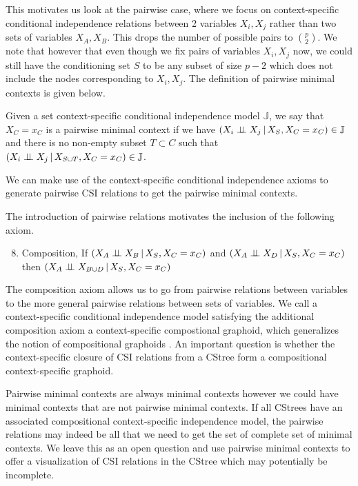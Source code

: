 \documentclass{tufte-book}
\begin{document}
This motivates us look at the pairwise case, where we focus on context-specific conditional independence relations between 2 variables \(X_i,X_j\) rather than two sets of variables \(X_A,X_B\). This drops the number of possible pairs to \(p \choose 2\). We note that however that even though we fix pairs of variables \(X_i,X_j\) now, we could still have the conditioning set \(S\) to be any subset of size \(p-2\) which does not include the nodes corresponding to \(X_i,X_j\). The definition of pairwise minimal contexts is given below.


\begin{definition}\label{def:pairmcs}
Given a set context-specific conditional independence model $\mathbb{J}$, we say that ${X_C=x_C}$ is a pairwise minimal context if we have $(X_i  \perp \!\!\! \perp X_j \,|\, X_S, X_C=x_C) \in \mathbb{J}$ and there is no non-empty subset $T \subset C$ such that $(X_i \perp \!\!\! \perp X_j \,|\, X_{S \cup T}, X_C=x_C) \in \mathbb{J}$.
\end{definition}

We can make use of the context-specific conditional independence axioms to generate pairwise CSI relations to get the pairwise minimal contexts.


The introduction of pairwise relations motivates the inclusion of the following axiom.
\begin{enumerate}
\setcounter{enumi}{7}
\item Composition, If \((X_A \perp \!\!\! \perp X_B \,|\, X_S, X_C=x_C)\) and \((X_A \perp \!\!\! \perp X_D \,|\,X_S,X_C=x_C)\) then \((X_A \perp \!\!\! \perp X_{B\cup D} \,|\,X_S,X_C=x_C)\)
\end{enumerate}


The composition axiom allows us to go from pairwise relations between variables to the more general pairwise relations between sets of variables. We call a context-specific conditional independence model satisfying the additional composition axiom a context-specific compostional graphoid, which generalizes the notion of compositional graphoids \cite{sadeghi-2014-markov-proper}. An important question is whether the context-specific closure of CSI relations from a CStree form a compositional context-specific graphoid.


Pairwise minimal contexts are always minimal contexts however we could have minimal contexts that are not pairwise minimal contexts. If all CStrees have an associated compositional context-specific independence model, the pairwise relations may indeed be all that we need to get the set of complete set of minimal contexts. We leave this as an open question and use pairwise minimal contexts to offer a visualization of CSI relations in the CStree which may potentially be incomplete.
\end{document}
